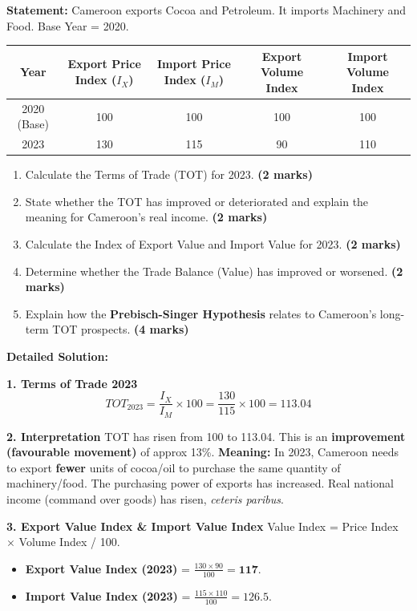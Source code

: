 \documentclass[11pt]{article}
\begin{document}
\begin{exoresolu}
\textbf{Statement:} Cameroon exports Cocoa and Petroleum. It imports Machinery and Food. Base Year = 2020.
\begin{center}
\begin{tabular}{|c|c|c|c|c|}\hline
\textbf{Year} & \textbf{Export Price Index ($I_X$)} & \textbf{Import Price Index ($I_M$)} & \textbf{Export Volume Index} & \textbf{Import Volume Index} \\ \hline
2020 (Base) & 100 & 100 & 100 & 100 \\ \hline
2023 & 130 & 115 & 90 & 110 \\ \hline
\end{tabular}
\end{center}
\begin{enumerate}
    \item Calculate the Terms of Trade (TOT) for 2023. \textbf{(2 marks)}
    \item State whether the TOT has improved or deteriorated and explain the meaning for Cameroon's real income. \textbf{(2 marks)}
    \item Calculate the Index of Export Value and Import Value for 2023. \textbf{(2 marks)}
    \item Determine whether the Trade Balance (Value) has improved or worsened. \textbf{(2 marks)}
    \item Explain how the \textbf{Prebisch-Singer Hypothesis} relates to Cameroon's long-term TOT prospects. \textbf{(4 marks)}
\end{enumerate}

\tcblower
\textbf{Detailed Solution:}

\textbf{1. Terms of Trade 2023}
\[ TOT_{2023} = \frac{I_X}{I_M} \times 100 = \frac{130}{115} \times 100 = \mathbf{113.04} \]

\textbf{2. Interpretation}
TOT has risen from 100 to 113.04. This is an \textbf{improvement (favourable movement)} of approx 13\%.
\textbf{Meaning:} In 2023, Cameroon needs to export \textbf{fewer} units of cocoa/oil to purchase the same quantity of machinery/food. The purchasing power of exports has increased. Real national income (command over goods) has risen, \emph{ceteris paribus}.

\textbf{3. Export Value Index \& Import Value Index}
Value Index = Price Index $\times$ Volume Index / 100.
\begin{itemize}
    \item \textbf{Export Value Index (2023)} = $\frac{130 \times 90}{100} = \mathbf{117}$.
    \item \textbf{Import Value Index (2023)} = $\frac{115 \times 110}{100} = \mathbf{126.5}$.
\end{itemize}


\end{exoresolu}
\end{document}
